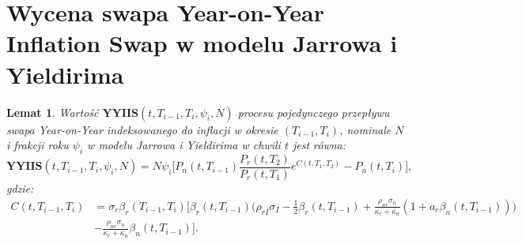 \documentclass{mini}
\theoremstyle{mythstyle}
\newtheorem{Lemat}{Lemat}[chapter]
\begin{document}
	\section{Wycena swapa Year-on-Year Inflation Swap w modelu Jarrowa i Yieldirima}
	\begin{Lemat}
		Wartość $\textbf{YYIIS}(t,T_{i-1},T_{i},\psi_i,N)$ procesu pojedynczego przepływu swapa Year-on-Year indeksowanego do inflacji w okresie $(T_{i-1}, T_i)$, nominale $N$ i frakcji roku $\psi_i$ w modelu Jarrowa i Yieldirima w chwili $t$ jest równa: 
		\begin{equation*}
		\textbf{YYIIS}(t, T_{i-1},T_i,\psi_i,N) = N \psi_i \bigg[ P_n(t,T_{i-1}) \frac{P_r(t,T_2)}{P_r(t,T_1)} e^{C(t,T_1,T_2)} - P_n(t,T_i) \bigg],
		\end{equation*}
		gdzie:
		\begin{align*}
		C(t,T_{i-1},T_i) &= \sigma_r\beta_r(T_{i-1},T_i) \bigg[ \beta_r(t,T_{i-1}) \bigg( \rho_{rI}\sigma_I - \frac{1}{2} \beta_r (t,T_{i-1}) 
		+ \frac{\rho_{nr}\sigma_n}{\kappa_r + \kappa_n} (1+a_r\beta_n(t,T_{i-1})) \bigg)\\&-  \frac{\rho_{nr}\sigma_n}{\kappa_r + \kappa_n} \beta_n(t,T_{i-1}) \bigg].
		\end{align*}
	\end{Lemat}
\end{document}
